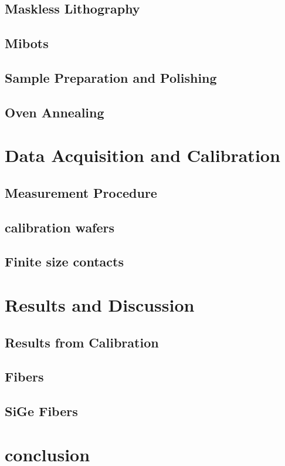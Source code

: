 \subsection{Maskless Lithography}
\subsection{Mibots}
\subsection{Sample Preparation and Polishing}
\subsection{Oven Annealing}



\section{Data Acquisition and Calibration}
\subsection{Measurement Procedure}
\subsection{calibration wafers}
\subsection{Finite size contacts}



\section{Results and Discussion}
\subsection{Results from Calibration}
\subsection{Fibers}
\subsection{SiGe Fibers}


\section{conclusion}
